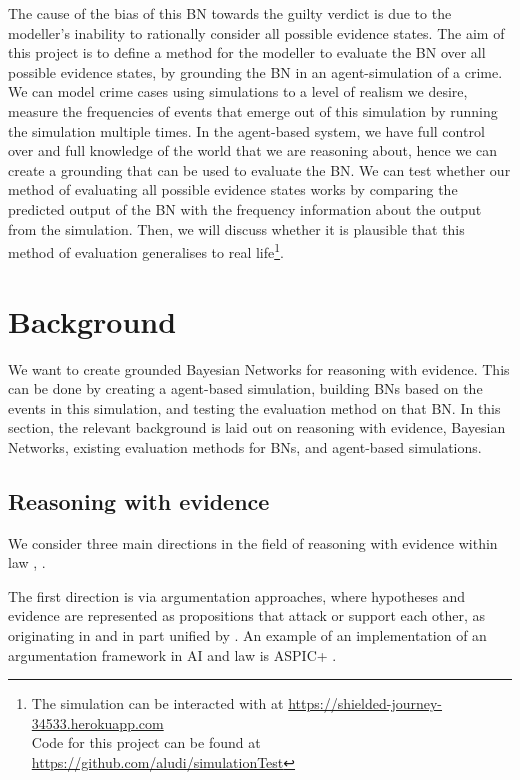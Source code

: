 \documentclass[11pt]{article}
\begin{document}
The cause of the bias of this BN towards the guilty verdict is due to the modeller's inability to rationally consider all possible evidence states. The aim of this project is to define a method for the modeller to evaluate the BN over all possible evidence states, by grounding the BN in an agent-simulation of a crime. We can model crime cases using simulations to a level of realism we desire, measure the frequencies of events that emerge out of this simulation by running the simulation multiple times. In the agent-based system, we have full control over and full knowledge of the world that we are reasoning about, hence we can create a grounding that can be used to evaluate the BN. We can test whether our method of evaluating all possible evidence states works by comparing the predicted output of the BN with the frequency information about the output from the simulation. Then, we will discuss whether it is plausible that this method of evaluation generalises to real life\footnote{The simulation can be interacted with at \url{https://shielded-journey-34533.herokuapp.com} \\ Code for this project can be found at \url{https://github.com/aludi/simulationTest}}.

\newpage

\section{Background}

We want to create grounded Bayesian Networks for reasoning with evidence. This can be done by creating a agent-based simulation, building BNs based on the events in this simulation, and testing the evaluation method on that BN. In this section, the relevant background is laid out on reasoning with evidence, Bayesian Networks, existing evaluation methods for BNs, and agent-based simulations.


\subsection{Reasoning with evidence}
We consider three main directions in the field of reasoning with evidence within law \citep{Verheij2015}, \citep{diBelloVerheij2018}. 

The first direction is via argumentation approaches, where hypotheses and evidence are represented as propositions that attack or support each other, as originating in \citep{wigmore1931} and in part unified by \citet{dung1995} \citep{benchcapon2019}. An example of an implementation of an argumentation framework in AI and law is ASPIC+ \citep{prakkenEtal2013}. 
\end{document}
